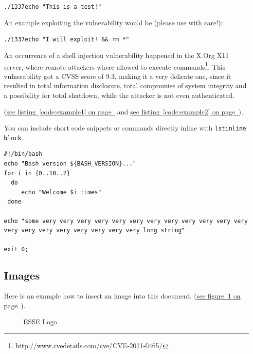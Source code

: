 \documentclass[12pt,a4paper,titlepage,oneside]{scrartcl}
\begin{document}
\lstinline{./1337echo "This is a test!"}

An example exploiting the vulnerability would be (please use with care!):

\lstinline{./1337echo "I will exploit! && rm *"}

An occurrence of a shell injection vulnerability happened in the X.Org X11 server, where remote attackers where allowed to execute commands\footnote{http://www.cvedetails.com/cve/CVE-2011-0465/}. This vulnerability got a CVSS score of 9.3, making it a very delicate one, since it resulted in total information disclosure, total compromise of system integrity and a possibility for total shutdown, while the attacker is not even authenticated.

(\hyperref[code:example1]{see listing~\ref*{code:example1} on page~\pageref*{code:example1}} and \hyperref[code:example2]{see listing~\ref*{code:example2} on page~\pageref*{code:example2}}).

You can include short code snippets or commands directly inline with \lstinline{lstinline block}.

%

\begin{lstlisting}[caption=Example bash script,label=code:example2,style=simple]
#!/bin/bash
echo "Bash version ${BASH_VERSION}..."
for i in {0..10..2}
  do
     echo "Welcome $i times"
 done

echo "some very very very very very very very very very very very very very very very very very very very very long string"

exit 0;
\end{lstlisting}

\subsection{Images}

Here is an example how to insert an image into this document.
(\hyperref[fig:logo1]{see figure~\ref*{fig:logo1} on page~\pageref*{fig:logo1}}).

\begin{figure}[h!]
  \centering
  \caption{ESSE Logo}
  \label{fig:logo1}
\end{figure}


%
%
\end{document}
